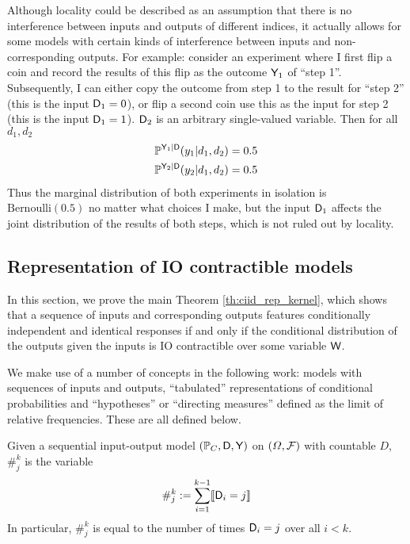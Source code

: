 Although locality could be described as an assumption that there is no interference between inputs and outputs of different indices, it actually allows for some models with certain kinds of interference between inputs and non-corresponding outputs. For example: consider an experiment where I first flip a coin and record the results of this flip as the outcome $\mathsf{Y}_1$ of ``step 1''. Subsequently, I can either copy the outcome from step 1 to the result for ``step 2'' (this is the input $\mathsf{D}_1=0$), or flip a second coin use this as the input for step 2 (this is the input $\mathsf{D}_1=1$). $\mathsf{D}_2$ is an arbitrary single-valued variable. Then for all $d_1, d_2$
\begin{align}
    \mathbb{P}^{\mathsf{Y}_1|\mathsf{D}}(y_1|d_1,d_2) &= 0.5\\
    \mathbb{P}^{\mathsf{Y}_2|\mathsf{D}}(y_2|d_1,d_2) &= 0.5
\end{align}
Thus the marginal distribution of both experiments in isolation is $\text{Bernoulli}(0.5)$ no matter what choices I make, but the input $\mathsf{D}_1$ affects the joint distribution of the results of both steps, which is not ruled out by locality.

\subsection[Representation of IO contractible models]{Representation of IO contractible models}\label{sec:rep_theorem}

In this section, we prove the main Theorem \ref{th:ciid_rep_kernel}, which shows that a sequence of inputs and corresponding outputs features conditionally independent and identical responses if and only if the conditional distribution of the outputs given the inputs is IO contractible over some variable $\mathsf{W}$.

We make use of a number of concepts in the following work: models with sequences of inputs and outputs, ``tabulated'' representations of conditional probabilities and ``hypotheses'' or ``directing measures'' defined as the limit of relative frequencies. These are all defined below.

\begin{definition}\label{def:count_of_inputs}
Given a sequential input-output model $(\mathbb{P}_C,\mathsf{D},\mathsf{Y})$ on $(\Omega,\mathcal{F})$ with countable $D$, $\#_{j}^k$ is the variable
\begin{align}
    \#_{j}^k := \sum_{i=1}^{k-1} \llbracket \mathsf{D}_i = j \rrbracket
\end{align}
In particular, $\#_{j}^k$ is equal to the number of times $\mathsf{D}_i=j$ over all $i<k$.
\end{definition}

